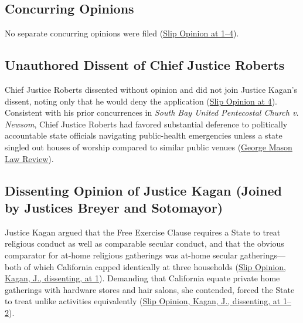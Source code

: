\documentclass[12pt]{article}
\begin{document}
\subsection{Concurring Opinions}
No separate concurring opinions were filed (\href{https://www.supremecourt.gov/opinions/20pdf/20a151_4g15.pdf}{Slip Opinion at 1--4}).

\subsection{Unauthored Dissent of Chief Justice Roberts}
Chief Justice Roberts dissented without opinion and did not join Justice Kagan's dissent, noting only that he would deny the application (\href{https://www.supremecourt.gov/opinions/20pdf/20a151_4g15.pdf}{Slip Opinion at 4}). Consistent with his prior concurrences in \textit{South Bay United Pentecostal Church v. Newsom}, Chief Justice Roberts had favored substantial deference to politically accountable state officials navigating public-health emergencies unless a state singled out houses of worship compared to similar public venues (\href{https://lawreview.gmu.edu/print__issues/religious-and-secular-comparators/}{George Mason Law Review}).

\subsection{Dissenting Opinion of Justice Kagan (Joined by Justices Breyer and Sotomayor)}
Justice Kagan argued that the Free Exercise Clause requires a State to treat religious conduct as well as comparable secular conduct, and that the obvious comparator for at-home religious gatherings was at-home secular gatherings---both of which California capped identically at three households (\href{https://www.supremecourt.gov/opinions/20pdf/20a151_4g15.pdf}{Slip Opinion, Kagan, J., dissenting, at 1}). Demanding that California equate private home gatherings with hardware stores and hair salons, she contended, forced the State to treat unlike activities equivalently (\href{https://www.supremecourt.gov/opinions/20pdf/20a151_4g15.pdf}{Slip Opinion, Kagan, J., dissenting, at 1--2}).
\end{document}
